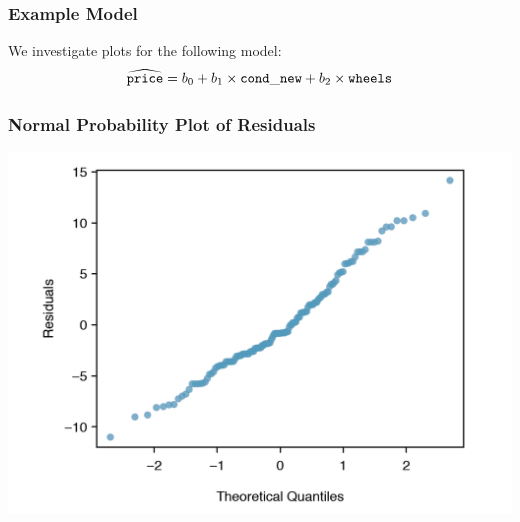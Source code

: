 \documentclass[handout]{beamer}
\begin{document}
\begin{frame}[fragile]
\frametitle{Example Model}
We investigate plots for the following model:
\[
\widehat{{\tt price}} = b_0 + b_1 \times {\tt cond\_new} + b_2 \times {\tt wheels}
\]


\end{frame}


\begin{frame}[fragile]
\frametitle{Normal Probability Plot of Residuals}

\begin{center}
\includegraphics[width=\textwidth]{figure/norm_prob_plot.png}
\end{center}

\end{frame}
\end{document}
